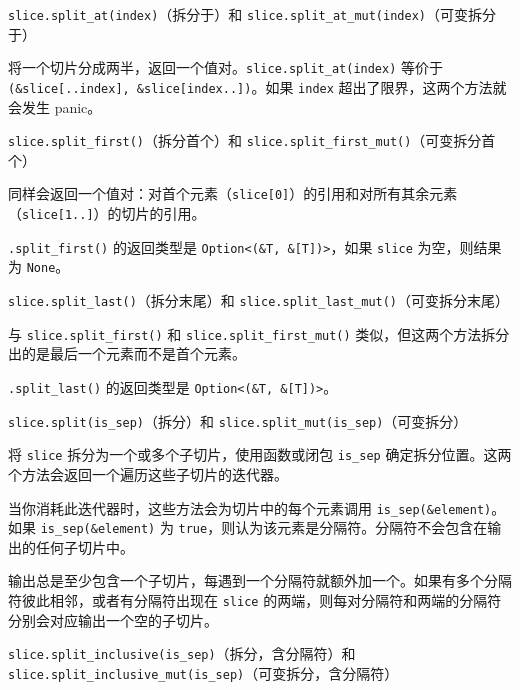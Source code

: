 \begin{myNote}
\texttt{slice.split\_at(index)}（拆分于）和 \texttt{slice.split\_at\_mut(index)}（可变拆分于）
\end{myNote}

将一个切片分成两半，返回一个值对。\texttt{slice.split\_at(index)} 等价于 \texttt{(\&slice[..index], \&slice[index..])}。如果 \texttt{index} 超出了限界，这两个方法就会发生 panic。

\begin{myNote}
\texttt{slice.split\_first()}（拆分首个）和 \texttt{slice.split\_first\_mut()}（可变拆分首个）
\end{myNote}

同样会返回一个值对：对首个元素（\texttt{slice[0]}）的引用和对所有其余元素（\texttt{slice[1..]}）的切片的引用。

\texttt{.split\_first()} 的返回类型是 \texttt{Option<(\&T, \&[T])>}，如果 \texttt{slice} 为空，则结果为 \texttt{None}。

\begin{myNote}
\texttt{slice.split\_last()}（拆分末尾）和 \texttt{slice.split\_last\_mut()}（可变拆分末尾）
\end{myNote}

与 \texttt{slice.split\_first()} 和 \texttt{slice.split\_first\_mut()} 类似，但这两个方法拆分出的是最后一个元素而不是首个元素。

\texttt{.split\_last()} 的返回类型是 \texttt{Option<(\&T, \&[T])>}。

\begin{myNote}
\texttt{slice.split(is\_sep)}（拆分）和 \texttt{slice.split\_mut(is\_sep)}（可变拆分）
\end{myNote}

将 \texttt{slice} 拆分为一个或多个子切片，使用函数或闭包 \texttt{is\_sep} 确定拆分位置。这两个方法会返回一个遍历这些子切片的迭代器。

当你消耗此迭代器时，这些方法会为切片中的每个元素调用 \texttt{is\_sep(\&element)}。如果 \texttt{is\_sep(\&element)} 为 \texttt{true}，则认为该元素是分隔符。分隔符不会包含在输出的任何子切片中。

输出总是至少包含一个子切片，每遇到一个分隔符就额外加一个。如果有多个分隔符彼此相邻，或者有分隔符出现在 \texttt{slice} 的两端，则每对分隔符和两端的分隔符分别会对应输出一个空的子切片。

\begin{myNote}
\texttt{slice.split\_inclusive(is\_sep)}（拆分，含分隔符）和 \texttt{slice.split\_inclusive\_mut(is\_sep)}（可变拆分，含分隔符）
\end{myNote}

